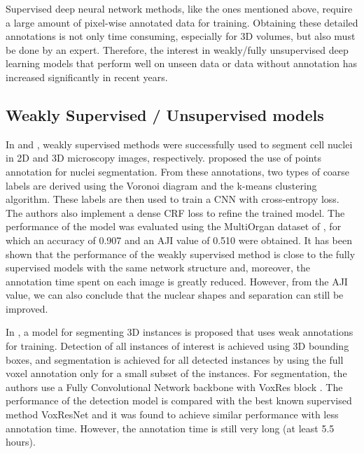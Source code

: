 Supervised deep neural network methods, like the ones mentioned above, require a large amount of pixel-wise annotated data for training. Obtaining these detailed annotations is not only time consuming, especially for \ac{3D} volumes, but also must be done by an expert. Therefore, the interest in weakly/fully unsupervised deep learning models that perform well on unseen data or data without annotation has increased significantly in recent years.

\subsection{Weakly Supervised / Unsupervised models}

In \cite{weakly:2D} and \cite{weakly:3D}, weakly supervised methods were successfully used to segment cell nuclei in \ac{2D} and \ac{3D} microscopy images, respectively. \citet{weakly:2D} proposed the use of points annotation for nuclei segmentation. From these annotations, two types of coarse labels are derived using the Voronoi diagram and the k-means clustering algorithm. These labels are then used to train a \ac{CNN} with cross-entropy loss. The authors also implement a dense CRF loss to refine the trained model. The performance of the model was evaluated using the MultiOrgan dataset of \cite{CNN3}, for which an accuracy of 0.907 and an \ac{AJI} value of 0.510 were obtained. It has been shown that the performance of the weakly supervised method is close to the fully supervised models with the same network structure and, moreover, the annotation time spent on each image is greatly reduced. However, from the \ac{AJI} value, we can also conclude that the nuclear shapes and separation can still be improved.

In \cite{weakly:3D}, a model for segmenting \ac{3D} instances is proposed that uses weak annotations for training. Detection of all instances of interest is achieved using \ac{3D} bounding boxes, and segmentation is achieved for all detected instances by using the full voxel annotation only for a small subset of the instances. For segmentation, the authors use a Fully Convolutional Network backbone with VoxRes block \cite{voxresnet}. The performance of the detection model is compared with the best known supervised method VoxResNet \cite{voxresnet} and it was found to achieve similar performance with less annotation time. However, the annotation time is still very long (at least 5.5 hours).


